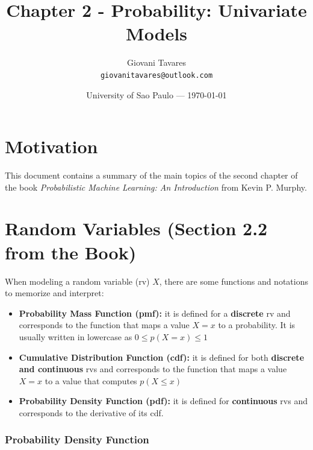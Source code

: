 \documentclass{article}
\title{Chapter 2 - Probability: Univariate Models} %
\author{Giovani Tavares\\ \texttt{giovanitavares@outlook.com}} %
\date{University of Sao Paulo --- \today} %
\begin{document}
\maketitle %


\section*{Motivation} %

This document contains a summary of the main topics of the second chapter of the book \textit{Probabilistic Machine Learning: An Introduction} from Kevin P. Murphy.



\section{Random Variables (Section 2.2 from the Book)}
When modeling a random variable (rv) $X$, there are some functions and notations to memorize and interpret:

\begin{itemize}
	\item \textbf{Probability Mass Function (pmf):} it is defined for a \textbf{discrete} rv and corresponds to the function that maps a value $X = x$ to a probability. It is usually written in lowercase as $0 \leq p(X = x) \leq 1$ 
	\item \textbf{Cumulative Distribution  Function (cdf):} it is defined for both \textbf{discrete and continuous} rvs and corresponds to the function that maps a value $X = x$ to a value that computes $p(X \leq x)$
	\item \textbf{Probability Density Function (pdf):} it is defined for  \textbf{continuous} rvs and corresponds to the derivative of its cdf.	
\end{itemize}

\subsubsection{Probability Density Function}
\end{document}
